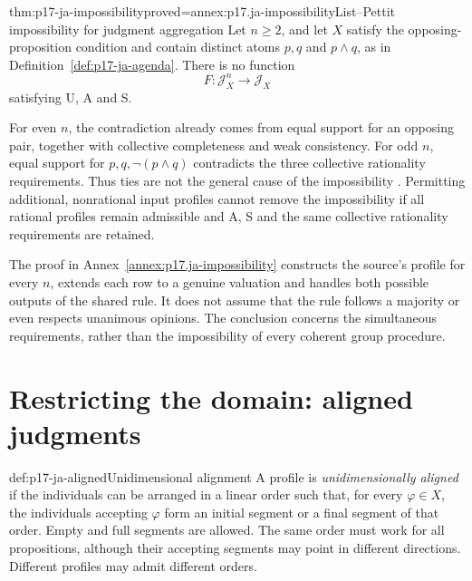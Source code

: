 \begin{hbtheorem}{thm:p17-ja-impossibility}{proved=annex:p17.ja-impossibility}{List--Pettit impossibility for judgment aggregation}
Let \(n\geq2\), and let \(X\) satisfy the opposing-proposition condition and
contain distinct atoms \(p,q\) and \(p\land q\), as in
Definition~\ref{def:p17-ja-agenda}. There is no function
\[
 F:\mathcal J_X^n\longrightarrow\mathcal J_X
\]
satisfying U, A and S.

For even \(n\), the contradiction already comes from equal support for an
opposing pair, together with collective completeness and weak consistency.
For odd \(n\), equal support for \(p,q,\neg(p\land q)\) contradicts the
three collective rationality requirements. Thus ties are not the general cause
of the impossibility \cite[pp.~26--29, note~5]{ListPettit2001JudgmentPreprint}.
Permitting additional, nonrational input profiles cannot remove the
impossibility if all rational profiles remain admissible and A, S and the
same collective rationality requirements are retained.
\end{hbtheorem}

The proof in Annex~\ref{annex:p17.ja-impossibility} constructs the source's
profile for every \(n\), extends each row to a genuine valuation and handles
both possible outputs of the shared rule. It does not assume that the rule
follows a majority or even respects unanimous opinions. The conclusion concerns
the simultaneous requirements, rather than the impossibility of every coherent
group procedure.

\section{Restricting the domain: aligned judgments}
\label{sec:p17-ja-alignment}

\begin{hbdefinition}{def:p17-ja-aligned}{Unidimensional alignment}
A profile is \emph{unidimensionally aligned} if the individuals can be arranged
in a linear order such that, for every \(\varphi\in X\), the individuals
accepting \(\varphi\) form an initial segment or a final segment of that order.
Empty and full segments are allowed. The same order must work for all
propositions, although their accepting segments may point in different
directions. Different profiles may admit different orders.
\end{hbdefinition}

